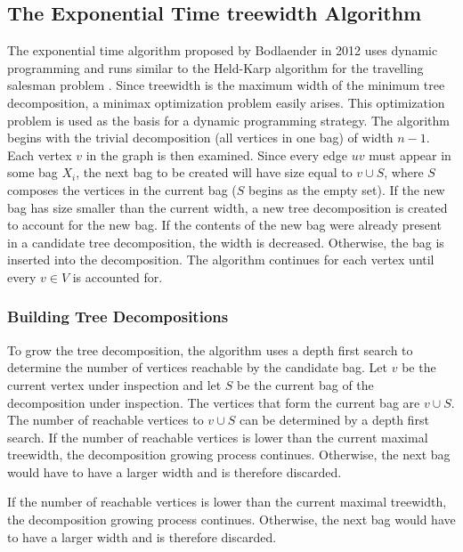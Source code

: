 \documentclass[12pt,conference]{IEEEtran}
\theoremstyle{plain}
\begin{document}
\subsection{The Exponential Time treewidth Algorithm}

The exponential time algorithm proposed by Bodlaender in 2012 uses dynamic programming and runs similar to the Held-Karp algorithm for the travelling salesman problem \cite{bodlaender-2012}. Since treewidth is the maximum width of the minimum tree decomposition, a minimax optimization problem easily arises. This optimization problem is used as the basis for a dynamic programming strategy. The algorithm begins with the trivial decomposition (all vertices in one bag) of width $n-1$. Each vertex $v$ in the graph is then examined. Since every edge $uv$ must appear in some bag $X_{i}$, the next bag to be created will have size equal to $v\cup S$, where $S$ composes the vertices in the current bag ($S$ begins as the empty set). If the new bag has size smaller than the current width, a new tree decomposition is created to account for the new bag. If the contents of the new bag were already present in a candidate tree decomposition, the width is decreased. Otherwise, the bag is inserted into the decomposition. The algorithm continues for each vertex until every $v\in V$ is accounted for.

\subsubsection{Building Tree Decompositions}

To grow the tree decomposition, the algorithm uses a depth first search to determine the number of vertices reachable by the candidate bag. Let $v$ be the current vertex under inspection and let $S$ be the current bag of the decomposition under inspection. The vertices that form the current bag are $v\cup S$. The number of reachable vertices to $v\cup S$ can be determined by a depth first search. If the number of reachable vertices is lower than the current maximal treewidth, the decomposition growing process continues. Otherwise, the next bag would have to have a larger width and is therefore discarded.

If the number of reachable vertices is lower than the current maximal treewidth, the decomposition growing process continues. Otherwise, the next bag would have to have a larger width and is therefore discarded.
\end{document}
